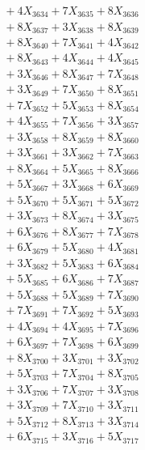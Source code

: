 \documentclass[a4paper,10pt]{article}
\begin{document}
{\begin{align}
&\;  + 4 X_{3634} + 7 X_{3635} + 8 X_{3636} \\[0.3ex]
&\;  + 8 X_{3637} + 3 X_{3638} + 8 X_{3639} \\[0.5ex]\allowbreak
&\;  + 8 X_{3640} + 7 X_{3641} + 4 X_{3642} \\[0.3ex]
&\;  + 8 X_{3643} + 4 X_{3644} + 4 X_{3645} \\[0.3ex]
&\;  + 3 X_{3646} + 8 X_{3647} + 7 X_{3648} \\[0.3ex]
&\;  + 3 X_{3649} + 7 X_{3650} + 8 X_{3651} \\[0.3ex]
&\;  + 7 X_{3652} + 5 X_{3653} + 8 X_{3654} \\[0.3ex]
&\;  + 4 X_{3655} + 7 X_{3656} + 3 X_{3657} \\[0.3ex]
&\;  + 3 X_{3658} + 8 X_{3659} + 8 X_{3660} \\[0.3ex]
&\;  + 3 X_{3661} + 3 X_{3662} + 7 X_{3663} \\[0.3ex]
&\;  + 8 X_{3664} + 5 X_{3665} + 8 X_{3666} \\[0.3ex]
&\;  + 5 X_{3667} + 3 X_{3668} + 6 X_{3669} \\[0.5ex]\allowbreak
&\;  + 5 X_{3670} + 5 X_{3671} + 5 X_{3672} \\[0.3ex]
&\;  + 3 X_{3673} + 8 X_{3674} + 3 X_{3675} \\[0.3ex]
&\;  + 6 X_{3676} + 8 X_{3677} + 7 X_{3678} \\[0.3ex]
&\;  + 6 X_{3679} + 5 X_{3680} + 4 X_{3681} \\[0.3ex]
&\;  + 3 X_{3682} + 5 X_{3683} + 6 X_{3684} \\[0.3ex]
&\;  + 5 X_{3685} + 6 X_{3686} + 7 X_{3687} \\[0.3ex]
&\;  + 5 X_{3688} + 5 X_{3689} + 7 X_{3690} \\[0.3ex]
&\;  + 7 X_{3691} + 7 X_{3692} + 5 X_{3693} \\[0.3ex]
&\;  + 4 X_{3694} + 4 X_{3695} + 7 X_{3696} \\[0.3ex]
&\;  + 6 X_{3697} + 7 X_{3698} + 6 X_{3699} \\[0.5ex]\allowbreak
&\;  + 8 X_{3700} + 3 X_{3701} + 3 X_{3702} \\[0.3ex]
&\;  + 5 X_{3703} + 7 X_{3704} + 8 X_{3705} \\[0.3ex]
&\;  + 3 X_{3706} + 7 X_{3707} + 3 X_{3708} \\[0.3ex]
&\;  + 3 X_{3709} + 7 X_{3710} + 3 X_{3711} \\[0.3ex]
&\;  + 5 X_{3712} + 8 X_{3713} + 3 X_{3714} \\[0.3ex]
&\;  + 6 X_{3715} + 3 X_{3716} + 5 X_{3717} \\[0.3ex]

\end{align}}
\end{document}
